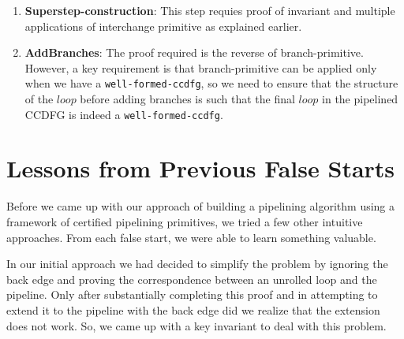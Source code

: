 \begin{enumerate}
\item \textbf{Superstep-construction}: This step requies proof of invariant and multiple applications of interchange primitive as explained earlier. 

\item \textbf{AddBranches}: The proof required is the reverse of branch-primitive. However, a key requirement is that branch-primitive can be applied only when we have a {\tt well-formed-ccdfg}, so we need to ensure that the structure of the $loop$ before adding branches is such that the final $loop$ in the pipelined CCDFG is indeed a {\tt well-formed-ccdfg}.  

\end{enumerate}

\section{Lessons from Previous False Starts}

Before we came up with our approach of building a pipelining
algorithm using a framework of certified pipelining primitives,
we tried a few other intuitive approaches.
From each false start, we were able to learn something valuable.

In our initial approach we had decided to simplify the problem
by ignoring the back edge and proving the correspondence
between an unrolled loop and the pipeline.
Only after substantially completing this proof and in
attempting to extend it to the pipeline with the back edge
did we realize that the extension does not work. So, we came up with a key
invariant to deal with this problem.

